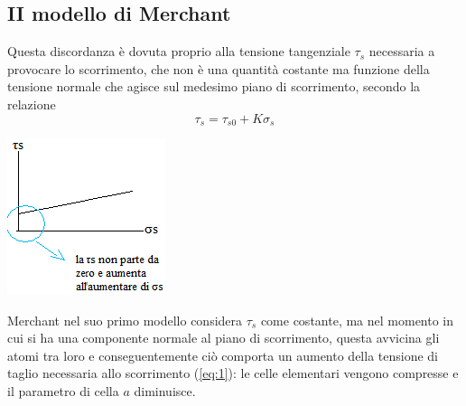 \documentclass[a4paper, 15pt]{article}
\begin{document}
\subsection{II modello di Merchant}	
	Questa discordanza è dovuta proprio alla tensione tangenziale $\tau_s$ necessaria a provocare lo scorrimento, che non è una quantità costante ma funzione della
	tensione normale che agisce sul medesimo piano di scorrimento, secondo la relazione
	\[\tau_s = \tau_{s0}+K\sigma_s\]
\begin{center}
	\includegraphics[width=0.3\linewidth]{figures/asp10}
\end{center}
	Merchant nel suo primo modello considera $\tau_s$  come costante, ma nel momento in cui si ha una componente normale al piano di scorrimento, questa avvicina gli atomi tra loro e conseguentemente ciò comporta un aumento della tensione di taglio necessaria allo scorrimento (\ref{eq:1}): le celle elementari vengono compresse e il parametro di cella $a$ diminuisce. \\
	
\end{document}

